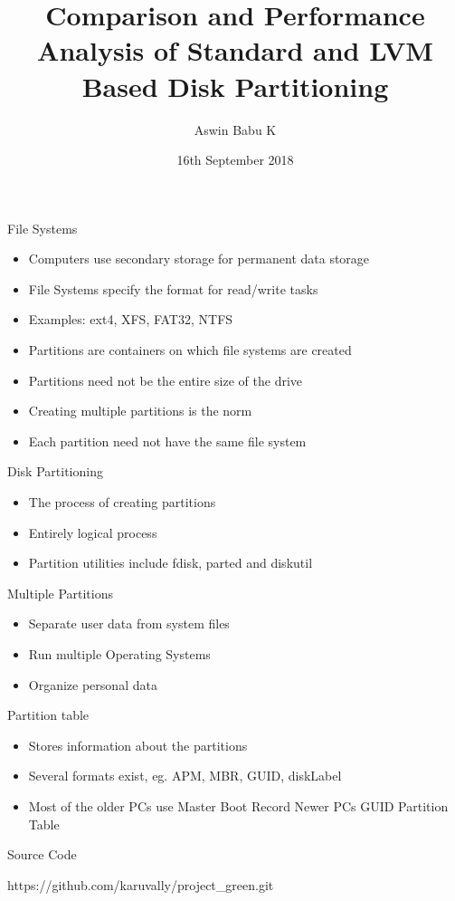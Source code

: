 \documentclass{beamer}
\title[Your Short Title]{Comparison and Performance Analysis of Standard and
LVM Based Disk Partitioning}
\author{Aswin Babu K}
\institute{College of Engineering Trivandrum}
\date{16th September 2018}
\begin{document}
\begin{frame}
    \titlepage
\end{frame}

\begin{frame}{File Systems}
    \begin{itemize}
        \item<2-> Computers use secondary storage for permanent data storage
        \item<3-> File Systems specify the format for read/write tasks
        \item<4-> Examples: ext4, XFS, FAT32, NTFS
        \item<5-> Partitions are containers on which file systems are created
        \item<6-> Partitions need not be the entire size of the drive
        \item<7-> Creating multiple partitions is the norm
        \item<8-> Each partition need not have the same file system
    \end{itemize}
\end{frame}

\begin{frame}{Disk Partitioning}
    \begin{itemize}
        \item<2-> The process of creating partitions
        \item<3-> Entirely logical process
        \item<4-> Partition utilities include fdisk, parted and diskutil
    \end{itemize}
\end{frame}

\begin{frame}{Multiple Partitions}
    \begin{itemize}
        \item<2-> Separate user data from system files
        \item<3-> Run multiple Operating Systems
        \item<4-> Organize personal data
    \end{itemize}
\end{frame}

\begin{frame}{Partition table}
    \begin{itemize}
        \item<2-> Stores information about the partitions
        \item<3-> Several formats exist, eg. APM, MBR, GUID, diskLabel
        \item<4-> Most of the older PCs use Master Boot Record
         Newer PCs GUID Partition Table
    \end{itemize}
\end{frame}

\begin{frame}{Source Code} 
    \begin{center}
        \large https://github.com/karuvally/project\_green.git
    \end{center}
\end{frame}
\end{document}
